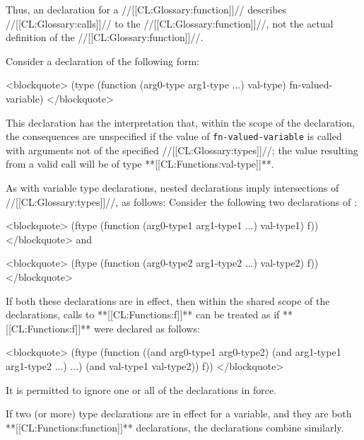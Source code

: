 Thus, an  declaration for a //[[CL:Glossary:function]]// describes //[[CL:Glossary:calls]]// to the //[[CL:Glossary:function]]//, not the actual definition of the //[[CL:Glossary:function]]//.

Consider a declaration of the following form:

<blockquote> (type (function (arg0-type arg1-type ...) val-type) fn-valued-variable) </blockquote>

This declaration has the interpretation that, within the scope of the declaration, the consequences are unspecified if the value of {\tt fn-valued-variable} is called with arguments not of the specified //[[CL:Glossary:types]]//; the value resulting from a valid call will be of type **[[CL:Functions:val-type]]**.

As with variable type declarations, nested declarations imply intersections of //[[CL:Glossary:types]]//, as follows: \beginlist \itemitem{\bull} Consider the following two declarations of :

<blockquote> (ftype (function (arg0-type1 arg1-type1 ...) val-type1) f)) </blockquote> and

<blockquote> (ftype (function (arg0-type2 arg1-type2 ...) val-type2) f)) </blockquote>

If both these declarations are in effect, then within the shared scope of the declarations, calls to **[[CL:Functions:f]]** can be treated as if **[[CL:Functions:f]]** were declared as follows:

<blockquote> (ftype (function ((and arg0-type1 arg0-type2) (and arg1-type1 arg1-type2 ...) ...) (and val-type1 val-type2)) f)) </blockquote>


It is permitted to ignore one or all of the  declarations in force.

\itemitem{\bull} If two (or more) type declarations are in effect for a variable, and they are both **[[CL:Functions:function]]** declarations, the declarations combine similarly. \endlist


      
